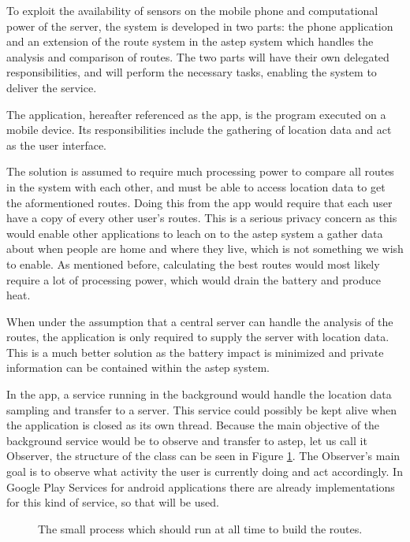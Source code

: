 To exploit the availability of sensors on the mobile phone and computational power of the server, the system is developed in two parts: the phone application and an extension of the route system in the \gls{astep} system which handles the analysis and comparison of routes.
The two parts will have their own delegated responsibilities, and will perform the necessary tasks, enabling the system to deliver the service.

The application, hereafter referenced as the app, is the program executed on a mobile device.
Its responsibilities include the gathering of location data and act as the user interface. 

The solution is assumed to require much processing power to compare all routes in the system with each other, and must be able to access location data to get the aformentioned routes.
Doing this from the app would require that each user have a copy of every other user's routes.
This is a serious privacy concern as this would enable other applications to leach on to the \gls{astep} system a gather data about when people are home and where they live, which is not something we wish to enable.
As mentioned before, calculating the best routes would most likely require a lot of processing power, which would drain the battery and produce heat.

When under the assumption that a central server can handle the analysis of the routes, the application is only required to supply the server with location data.
This is a much better solution as the battery impact is minimized and private information can be contained within the \gls{astep} system.

In the app, a service running in the background would handle the location data sampling and transfer to a server.
This service could possibly be kept alive when the application is closed as its own thread.
Because the main objective of the background service would be to observe and transfer to \gls{astep}, let us call it Observer, the structure of the class can be seen in Figure \ref{fig:classDiagramSprint1Observer}.
The Observer's main goal is to observe what activity the user is currently doing and act accordingly.
In Google Play Services for android applications there are already implementations for this kind of service, so that will be used.

\begin{figure}[h]
	\centering
	
	\caption{The small process which should run at all time to build the routes.}
	\label{fig:classDiagramSprint1Observer}
\end{figure}

